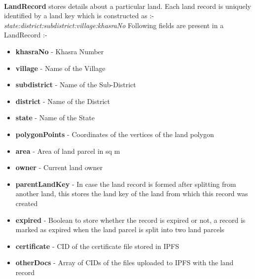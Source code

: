 \documentclass{article}
\begin{document}
        \paragraph{}
        \textbf{LandRecord} stores details about a particular land. Each land record is uniquely identified by a land key which is constructed as :-
        \textit{state:district:subdistrict:village:khasraNo}
        Following fields are present in a LandRecord :-
        \begin{itemize}
            \item \textbf{khasraNo} - Khasra Number
            \item \textbf{village} - Name of the Village
            \item \textbf{subdistrict} - Name of the Sub-District
            \item \textbf{district} - Name of the District
            \item \textbf{state} - Name of the State
            \item \textbf{polygonPoints} - Coordinates of the vertices of the land polygon
            \item \textbf{area} - Area of land parcel in sq m
            \item \textbf{owner} - Current land owner
            \item \textbf{parentLandKey} - In case the land record is formed after splitting from another land, this stores the land key of the land from which this record was created
            \item \textbf{expired} - Boolean to store whether the record is expired or not, a record is marked as expired when the land parcel is split into two land parcels
            \item \textbf{certificate} - CID of the certificate file stored in IPFS
            \item \textbf{otherDocs} - Array of CIDs of the files uploaded to IPFS with the land record
        \end{itemize}
\end{document}
